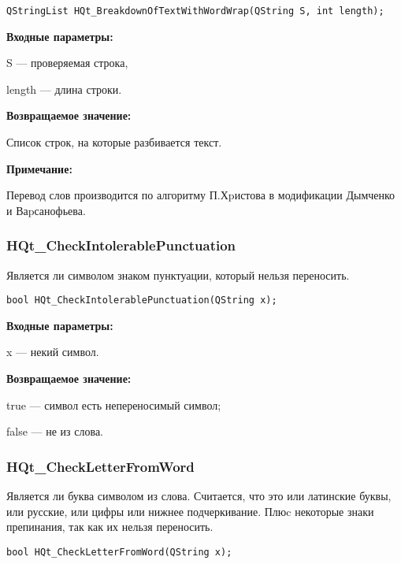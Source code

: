 \documentclass[a4paper,12pt]{article}
\begin{document}
\begin{lstlisting}[label=code_syntax_HQt_BreakdownOfTextWithWordWrap,caption=Синтаксис]
QStringList HQt_BreakdownOfTextWithWordWrap(QString S, int length);
\end{lstlisting}

\textbf{Входные параметры:}

S --- проверяемая строка,

length ---  длина строки.

\textbf{Возвращаемое значение:}
 
Список строк, на которые разбивается текст.

\textbf{Примечание:}

Перевод слов производится по алгоритму П.Хpистова в модификации Дымченко и Ваpсанофьева.


\subsubsection{HQt\_CheckIntolerablePunctuation}\label{HQt_CheckIntolerablePunctuation}

Является ли символом знаком пунктуации, который нельзя переносить.


\begin{lstlisting}[label=code_syntax_HQt_CheckIntolerablePunctuation,caption=Синтаксис]
bool HQt_CheckIntolerablePunctuation(QString x);
\end{lstlisting}

\textbf{Входные параметры:}

x --- некий символ.

\textbf{Возвращаемое значение:}
 
true --- символ есть непереносимый символ;

false --- не из слова.


\subsubsection{HQt\_CheckLetterFromWord}\label{HQt_CheckLetterFromWord}

Является ли буква символом из слова. Считается, что это или латинские буквы, или русские, или цифры или нижнее подчеркивание. Плюc некоторые знаки препинания, так как их нельзя переносить.


\begin{lstlisting}[label=code_syntax_HQt_CheckLetterFromWord,caption=Синтаксис]
bool HQt_CheckLetterFromWord(QString x);
\end{lstlisting}
\end{document}
